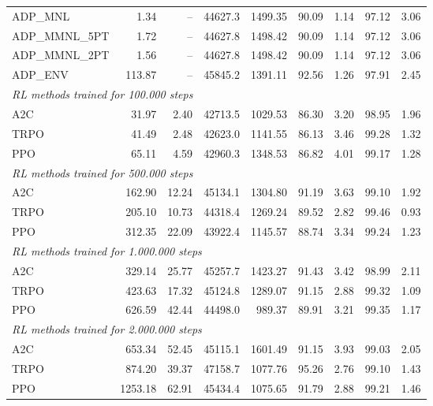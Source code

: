 \begin{samepage}
\begin{center}
\begin{tabular}{l|rr|rr|rr|rr}
    \midrule
    ADP\_MNL     &     1.34 &    -- &    44627.3 &    1499.35 &   90.09 &    1.14 &   97.12 &    3.06 \\
    ADP\_MMNL\_5PT &     1.72 &    -- &    44627.8 &    1498.42 &   90.09 &    1.14 &   97.12 &    3.06 \\
    ADP\_MMNL\_2PT &     1.56 &    -- &    44627.8 &    1498.42 &   90.09 &    1.14 &   97.12 &    3.06 \\
    ADP\_ENV     &   113.87 &    -- &    45845.2 &    1391.11 &   92.56 &    1.26 &   97.91 &    2.45 \\
    \midrule
    \multicolumn{9}{l}{\textit{RL methods trained for 100.000 steps}} \\
    \midrule
    A2C          &    31.97 &     2.40 &    42713.5 &    1029.53 &   86.30 &    3.20 &   98.95 &    1.96 \\
    TRPO         &    41.49 &     2.48 &    42623.0 &    1141.55 &   86.13 &    3.46 &   99.28 &    1.32 \\
    PPO          &    65.11 &     4.59 &    42960.3 &    1348.53 &   86.82 &    4.01 &   99.17 &    1.28 \\
    \midrule
    \multicolumn{9}{l}{\textit{RL methods trained for 500.000 steps}} \\
    \midrule
    A2C          &   162.90 &    12.24 &    45134.1 &    1304.80 &   91.19 &    3.63 &   99.10 &    1.92 \\
    TRPO         &   205.10 &    10.73 &    44318.4 &    1269.24 &   89.52 &    2.82 &   99.46 &    0.93 \\
    PPO          &   312.35 &    22.09 &    43922.4 &    1145.57 &   88.74 &    3.34 &   99.24 &    1.23 \\
    \midrule
    \multicolumn{9}{l}{\textit{RL methods trained for 1.000.000 steps}} \\
    \midrule
    A2C          &   329.14 &    25.77 &    45257.7 &    1423.27 &   91.43 &    3.42 &   98.99 &    2.11 \\
    TRPO         &   423.63 &    17.32 &    45124.8 &    1289.07 &   91.15 &    2.88 &   99.32 &    1.09 \\
    PPO          &   626.59 &    42.44 &    44498.0 &     989.37 &   89.91 &    3.21 &   99.35 &    1.17 \\
    \midrule
    \multicolumn{9}{l}{\textit{RL methods trained for 2.000.000 steps}} \\
    \midrule
    A2C          &   653.34 &    52.45 &    45115.1 &    1601.49 &   91.15 &    3.93 &   99.03 &    2.05 \\
    TRPO         &   874.20 &    39.37 &    47158.7 &    1077.76 &   95.26 &    2.76 &   99.10 &    1.43 \\
    PPO          &  1253.18 &    62.91 &    45434.4 &    1075.65 &   91.79 &    2.88 &   99.21 &    1.46 \\
    \bottomrule
  \end{tabular}
\end{center}
\end{samepage}

